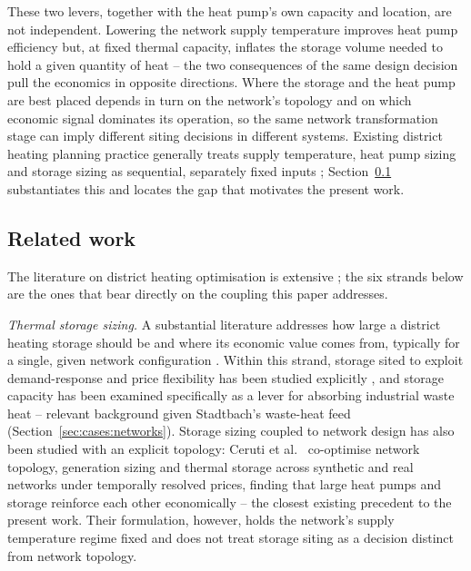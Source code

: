 \documentclass[review,3p]{elsarticle}
\begin{document}
These two levers, together with the heat pump's own capacity and
location, are not independent. Lowering the network supply temperature
improves heat pump efficiency but, at fixed thermal capacity, inflates
the storage volume needed to hold a given quantity of heat -- the two
consequences of the same design decision pull the economics in opposite
directions. Where the storage and the heat pump are best placed depends
in turn on the network's topology and on which economic signal
dominates its operation, so the same network transformation stage can
imply different siting decisions in different systems. Existing district
heating planning practice generally treats supply temperature, heat
pump sizing and storage sizing as sequential, separately fixed inputs
\cite{Terlouw.2025}; Section~\ref{sec:intro:relatedwork} substantiates
this and locates the gap that motivates the present work.

\subsection{Related work}
\label{sec:intro:relatedwork}

The literature on district heating optimisation is extensive
\cite{Li.2017,Sameti.2017}; the six strands below are the ones that
bear directly on the coupling this paper addresses.

\emph{Thermal storage sizing.} A substantial literature addresses how
large a district heating storage should be and where its economic value
comes from, typically for a single, given network configuration
\cite{Dahash.2019,Dahash.2021,Sifnaios.2023,Renaldi.2017,Gabrielli.2018,
Ryan.2022,Lesko.2018,Nuytten.2013}. Within this strand, storage sited to
exploit demand-response and price flexibility has been studied
explicitly \cite{Capone.2021}, and storage capacity has been examined
specifically as a lever for absorbing industrial waste heat
\cite{Yang.2020} -- relevant background given Stadtbach's waste-heat
feed (Section~\ref{sec:cases:networks}). Storage sizing coupled to
network design has also been studied with an explicit topology: Ceruti
et al.\ \cite{Ceruti.2025} co-optimise network topology, generation
sizing and thermal storage
across synthetic and real networks under temporally resolved prices,
finding that large heat pumps and storage reinforce each other
economically -- the closest existing precedent to the present work.
Their formulation, however, holds the network's supply temperature
regime fixed and does not treat storage siting as a decision distinct
from network topology.
\end{document}
